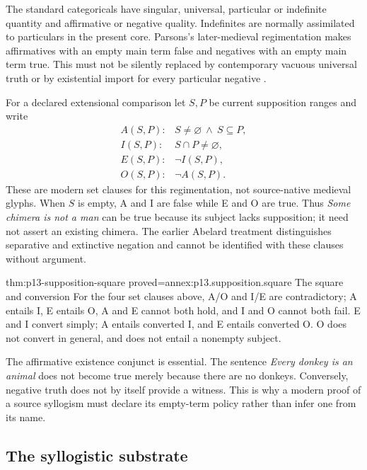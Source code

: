 The standard categoricals have singular, universal, particular or
indefinite quantity and affirmative or negative quality. Indefinites
are normally assimilated to particulars in the present core.
Parsons's later-medieval regimentation makes affirmatives with an empty
main term false and negatives with an empty main term true.
This must not be silently replaced by contemporary vacuous universal
truth or by existential import for every particular negative
\cite[pp.~159--165]{Parsons2007FordhamSupposition}.

For a declared extensional comparison let \(S,P\) be current
supposition ranges and write
\[
\begin{array}{ll}
A(S,P):& S\ne\varnothing\ \land\ S\subseteq P,\\
I(S,P):& S\cap P\ne\varnothing,\\
E(S,P):& \neg I(S,P),\\
O(S,P):& \neg A(S,P).
\end{array}
\]
These are modern set clauses for this regimentation, not source-native
medieval glyphs. When \(S\) is empty, A and I are false while E and O
are true. Thus \emph{Some chimera is not a man} can be true because its
subject lacks supposition; it need not assert an existing chimera.
The earlier Abelard treatment distinguishes separative and extinctive
negation and cannot be identified with these clauses without argument.

\begin{hbtheorem}{thm:p13-supposition-square}
 {proved=annex:p13.supposition.square}
 {The square and conversion}
For the four set clauses above, A/O and I/E are contradictory;
A entails I, E entails O, A and E cannot both hold, and I and O
cannot both fail. E and I convert simply; A entails converted I,
and E entails converted O. O does not convert in general, and
does not entail a nonempty subject.
\end{hbtheorem}

The affirmative existence conjunct is essential. The sentence
\emph{Every donkey is an animal} does not become true merely because
there are no donkeys. Conversely, negative truth does not by itself
provide a witness. This is why a modern proof of a source syllogism
must declare its empty-term policy rather than infer one from its name.

\subsection{The syllogistic substrate}
\label{sec:p13-supposition-syllogistic}

